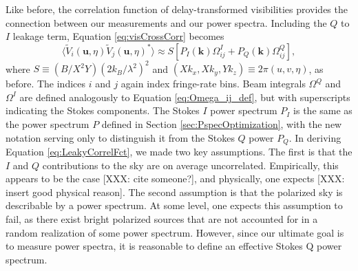 \documentclass[twocolumn,apj,numberedappendix]{emulateapj}
\begin{document}
Like before, the correlation function of delay-transformed visibilities provides the connection between our
measurements and our power spectra. Including the $Q$ to $I$ leakage term, Equation \eqref{eq:visCrossCorr}
becomes
\begin{equation}
\label{eq:LeakyCorrelFct}
\langle \widetilde{V}_i(\mathbf{u},\eta) \widetilde{V}_j(\mathbf{u},\eta)^*\rangle \approx S \left[P_I (\mathbf{k}) \Omega_{ij}^I + P_Q (\mathbf{k}) \Omega_{ij}^Q\right],
\end{equation}
where $S \equiv ( B / X^2 Y) ( 2 k_B / \lambda^2 )^2$ and $(X k_x, X k_y, Y k_z) \equiv 2 \pi (u , v, \eta)$, as before. The indices $i$ and $j$ again index fringe-rate
bins. Beam integrals $\Omega^Q$ and $\Omega^I$ are defined analogously to Equation \eqref{eq:Omega_ij_def},
but with superscripts indicating the Stokes components. The Stokes $I$ power spectrum $P_I$ is the same as the
power spectrum $P$ defined in Section \ref{sec:PspecOptimization}, with the new notation serving only to
distinguish it from the Stokes $Q$ power $P_Q$. In deriving Equation \eqref{eq:LeakyCorrelFct}, we made two
key assumptions. The first is that the $I$ and $Q$ contributions to the sky are on average uncorrelated. Empirically, 
this appears to be the case [XXX: cite someone?], and physically, one expects [XXX: insert good physical reason].
The second assumption is that the polarized sky is describable by a power spectrum. At some level, one expects
this assumption to fail, as there exist bright polarized sources that are not accounted for in a random realization
of some power spectrum. However, since our ultimate goal is to measure power spectra, it is reasonable to
define an effective Stokes Q power spectrum.
\end{document}
